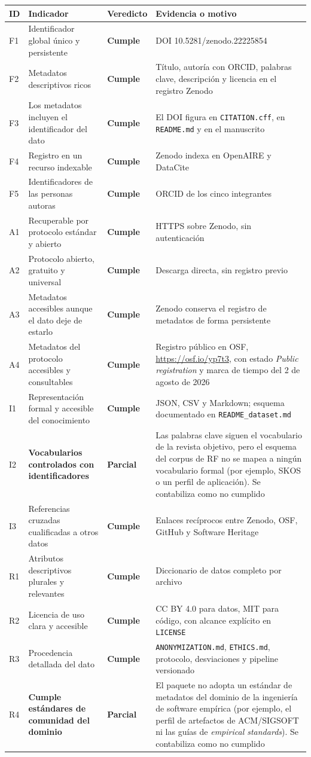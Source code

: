 \documentclass[11pt,a4paper]{article}
\newcommand{\si}{\textcolor{uteqverde}{\textbf{Cumple}}}
\newcommand{\parcial}{\textcolor{ambar}{\textbf{Parcial}}}
\begin{document}
\begin{longtable}{@{}p{1.1cm}p{5.3cm}p{2.1cm}p{7.3cm}@{}}
\toprule
\textbf{ID} & \textbf{Indicador} & \textbf{Veredicto} & \textbf{Evidencia o motivo} \\
\midrule
\endhead
F1 & Identificador global único y persistente & \si & DOI 10.5281/zenodo.22225854 \\
F2 & Metadatos descriptivos ricos & \si & Título, autoría con ORCID, palabras clave, descripción y licencia en el registro Zenodo \\
F3 & Los metadatos incluyen el identificador del dato & \si & El DOI figura en \texttt{CITATION.cff}, en \texttt{README.md} y en el manuscrito \\
F4 & Registro en un recurso indexable & \si & Zenodo indexa en OpenAIRE y DataCite \\
F5 & Identificadores de las personas autoras & \si & ORCID de los cinco integrantes \\
\midrule
A1 & Recuperable por protocolo estándar y abierto & \si & HTTPS sobre Zenodo, sin autenticación \\
A2 & Protocolo abierto, gratuito y universal & \si & Descarga directa, sin registro previo \\
A3 & Metadatos accesibles aunque el dato deje de estarlo & \si & Zenodo conserva el registro de metadatos de forma persistente \\
A4 & Metadatos del protocolo accesibles y consultables & \si & Registro público en OSF, \url{https://osf.io/yp7t3}, con estado \textit{Public registration} y marca de tiempo del 2 de agosto de 2026 \\
\midrule
I1 & Representación formal y accesible del conocimiento & \si & JSON, CSV y Markdown; esquema documentado en \texttt{README\_dataset.md} \\
I2 & \textbf{Vocabularios controlados con identificadores} & \parcial & Las palabras clave siguen el vocabulario de la revista objetivo, pero el esquema del corpus de RF no se mapea a ningún vocabulario formal (por ejemplo, SKOS o un perfil de aplicación). Se contabiliza como no cumplido \\
I3 & Referencias cruzadas cualificadas a otros datos & \si & Enlaces recíprocos entre Zenodo, OSF, GitHub y Software Heritage \\
\midrule
R1 & Atributos descriptivos plurales y relevantes & \si & Diccionario de datos completo por archivo \\
R2 & Licencia de uso clara y accesible & \si & CC BY 4.0 para datos, MIT para código, con alcance explícito en \texttt{LICENSE} \\
R3 & Procedencia detallada del dato & \si & \texttt{ANONYMIZATION.md}, \texttt{ETHICS.md}, protocolo, desviaciones y pipeline versionado \\
R4 & \textbf{Cumple estándares de comunidad del dominio} & \parcial & El paquete no adopta un estándar de metadatos del dominio de la ingeniería de software empírica (por ejemplo, el perfil de artefactos de ACM/SIGSOFT ni las guías de \textit{empirical standards}). Se contabiliza como no cumplido \\
\bottomrule
\end{longtable}
\end{document}
